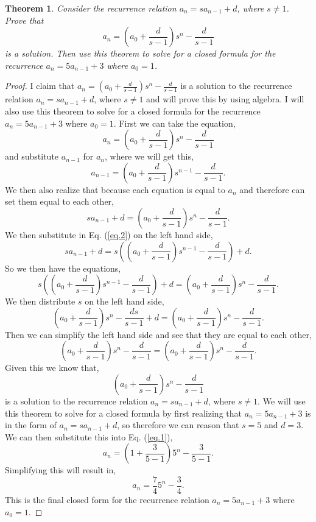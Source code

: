 \documentclass[11pt,titlepage]{article}		%
\newtheorem{theorem}{Theorem}
\theoremstyle{definition}
\theoremstyle{theorem}
\begin{document}
\clearpage

\begin{theorem}
    Consider the recurrence relation $a_n = s a_{n-1}+d$, where $s\ne 1$.
    Prove that
    \[
        a_n = \left(a_0 + \frac{d}{s-1}\right) s^n - \frac{d}{s-1}
    \]
    is a solution. Then use this theorem to solve for a closed formula for the recurrence $a_n = 5 a_{n-1} + 3$ where $a_0 = 1$.
\end{theorem}

\begin{proof}
    I claim that $ a_n = \left(a_0 + \frac{d}{s-1}\right) s^n - \frac{d}{s-1}$ is a solution to the recurrence relation $a_n = s a_{n-1}+d$, where $s\ne 1$ and will prove this by using algebra.
    I will also use this theorem to solve for a closed formula for the recurrence $a_n = 5 a_{n-1} + 3$ where $a_0 = 1$.
    First we can take the equation,
    \begin{equation} \label{eq.1}
        a_n = \left(a_0 + \frac{d}{s-1}\right) s^n - \frac{d}{s-1}
    \end{equation}
    and substitute $a_{n-1}$ for $a_n$, where we will get this,
    \begin{equation} \label{eq.2}
        a_{n-1} = \left(a_0 + \frac{d}{s-1}\right) s^{n-1} - \frac{d}{s-1}.
    \end{equation}
    We then also realize that because each equation is equal to $a_n$ and therefore can set them equal to each other,
    \[
        s a_{n-1}+d = \left(a_0 + \frac{d}{s-1}\right) s^n - \frac{d}{s-1}.
    \]
    We then substitute in Eq. (\ref{eq.2}) on the left hand side,
    \[
        s a_{n-1}+d = s (\left(a_0 + \frac{d}{s-1}\right) s^{n-1} - \frac{d}{s-1}) + d.
    \]
    So we then have the equations,
    \[
        s (\left(a_0 + \frac{d}{s-1}\right) s^{n-1} - \frac{d}{s-1}) + d = \left(a_0 + \frac{d}{s-1}\right) s^n - \frac{d}{s-1}.
    \]
    We then distribute $s$ on the left hand side,
    \[
        \left(a_0 + \frac{d}{s-1}\right) s^{n} - \frac{ds}{s-1} + d  = \left(a_0 + \frac{d}{s-1}\right) s^n - \frac{d}{s-1}.
    \]
    Then we can simplify the left hand side and see that they are equal to each other,
    \[
        \left(a_0 + \frac{d}{s-1}\right) s^{n} - \frac{d}{s-1}  = \left(a_0 + \frac{d}{s-1}\right) s^n - \frac{d}{s-1}.
    \]
    Given this we know that,
    \[
        \left(a_0 + \frac{d}{s-1}\right) s^n - \frac{d}{s-1}
    \]
    is a solution to the recurrence relation $a_n = s a_{n-1}+d$, where $s\ne 1$.
    We will use this theorem to solve for a closed formula by first realizing that $a_n = 5 a_{n-1} + 3$ is in the form of $a_n = s a_{n-1}+d$, so therefore we can reason that $s = 5$ and $d = 3$. We can then substitute this into Eq. (\ref{eq.1}),
    \[
        a_n = \left(1 + \frac{3}{5-1}\right) 5^n - \frac{3}{5-1}.
    \]
    Simplifying this will result in,
    \[
        a_n = \frac{7}{4} 5^n - \frac{3}{4}.
    \]
    This is the final closed form for the recurrence relation $a_n = 5 a_{n-1} + 3$ where $a_0 = 1$.
    
\end{proof}
\end{document}

